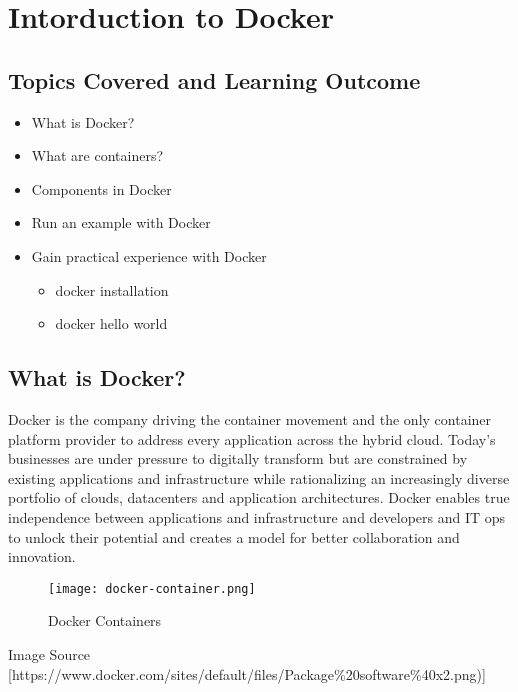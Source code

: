 \section{Intorduction to Docker}\label{intorduction-to-docker}

\subsection{Topics Covered and Learning
Outcome}\label{topics-covered-and-learning-outcome}

\begin{itemize}

\item
  What is Docker?
\item
  What are containers?
\item
  Components in Docker
\item
  Run an example with Docker
\item
  Gain practical experience with Docker

  \begin{itemize}

  \item
    docker installation
  \item
    docker hello world
  \end{itemize}
\end{itemize}

\subsection{What is Docker?}\label{what-is-docker}

Docker is the company driving the container movement and the only
container platform provider to address every application across the
hybrid cloud. Today's businesses are under pressure to digitally
transform but are constrained by existing applications and
infrastructure while rationalizing an increasingly diverse portfolio of
clouds, datacenters and application architectures. Docker enables true
independence between applications and infrastructure and developers and
IT ops to unlock their potential and creates a model for better
collaboration and innovation.

\begin{figure}[htbp]
\centering
\texttt{[image: docker-container.png]}
\caption{Docker Containers}
\end{figure}

Image Source
{[}https://www.docker.com/sites/default/files/Package\%20software\%40x2.png){]}

